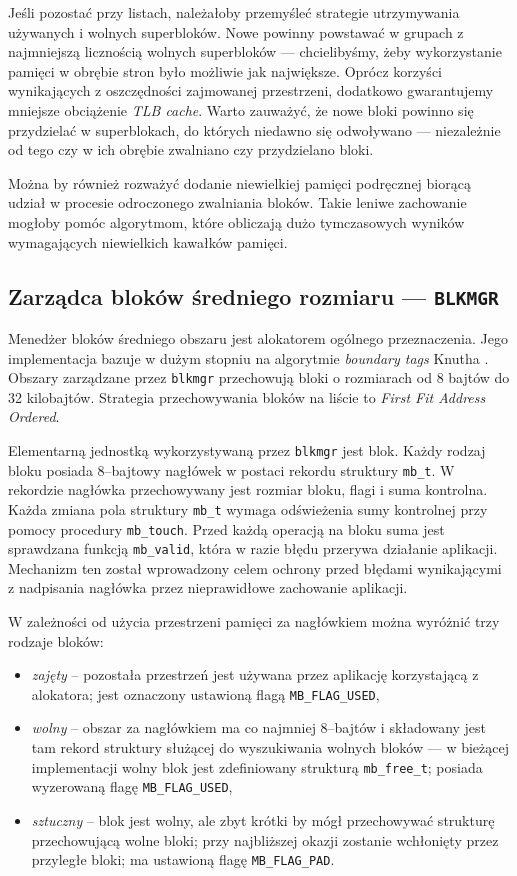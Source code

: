 \documentclass[12pt,a4paper,titlepage,twoside]{mwart}
\begin{document}
Jeśli pozostać przy listach, należałoby przemyśleć strategie utrzymywania
używanych i wolnych superbloków. Nowe powinny powstawać w grupach z najmniejszą
licznością wolnych superbloków --- chcielibyśmy, żeby wykorzystanie pamięci w
obrębie stron było możliwie jak największe. Oprócz korzyści wynikających z
oszczędności zajmowanej przestrzeni, dodatkowo gwarantujemy mniejsze obciążenie
\textit{TLB cache}. Warto zauważyć, że nowe bloki powinno się przydzielać w
superblokach, do których niedawno się odwoływano --- niezależnie od tego czy
w ich obrębie zwalniano czy przydzielano bloki.

Można by również rozważyć dodanie niewielkiej pamięci podręcznej biorącą udział
w procesie odroczonego zwalniania bloków. Takie leniwe zachowanie mogłoby pomóc
algorytmom, które obliczają dużo tymczasowych wyników wymagających niewielkich
kawałków pamięci.

\subsection{Zarządca bloków średniego rozmiaru --- \texttt{BLKMGR}}

Menedżer bloków średniego obszaru jest alokatorem ogólnego przeznaczenia. Jego
implementacja bazuje w dużym stopniu na algorytmie \textit{boundary tags}
Knutha \cite{knuth73fundamental}. Obszary zarządzane przez \texttt{blkmgr}
przechowują bloki o rozmiarach od 8 bajtów do 32 kilobajtów. Strategia
przechowywania bloków na liście to \textit{First Fit Address Ordered}.

Elementarną jednostką wykorzystywaną przez \texttt{blkmgr} jest blok. Każdy
rodzaj bloku posiada $8$--bajtowy nagłówek w postaci rekordu struktury
\texttt{mb\_t}. W rekordzie nagłówka przechowywany jest rozmiar bloku, flagi i
suma kontrolna. Każda zmiana pola struktury \verb+mb_t+ wymaga odświeżenia sumy
kontrolnej przy pomocy procedury \verb+mb_touch+. Przed każdą operacją na bloku
suma jest sprawdzana funkcją \verb+mb_valid+, która w razie błędu przerywa
działanie aplikacji. Mechanizm ten został wprowadzony celem ochrony przed
błędami wynikającymi z nadpisania nagłówka przez nieprawidłowe zachowanie
aplikacji.

W zależności od użycia przestrzeni pamięci za nagłówkiem można wyróżnić trzy
rodzaje bloków:
\begin{itemize}
\item \textit{zajęty} -- pozostała przestrzeń jest używana przez aplikację
korzystającą z alokatora; jest oznaczony ustawioną flagą \verb+MB_FLAG_USED+,
\item \textit{wolny} -- obszar za nagłówkiem ma co najmniej $8$--bajtów i
składowany jest tam rekord struktury służącej do wyszukiwania wolnych bloków
--- w bieżącej implementacji wolny blok jest zdefiniowany strukturą
\verb+mb_free_t+; posiada wyzerowaną flagę \verb+MB_FLAG_USED+,
\item \textit{sztuczny} -- blok jest wolny, ale zbyt krótki by mógł
przechowywać strukturę przechowującą wolne bloki; przy najbliższej okazji
zostanie wchłonięty przez przyległe bloki; ma ustawioną flagę
\verb+MB_FLAG_PAD+.
\end{itemize}
\end{document}
